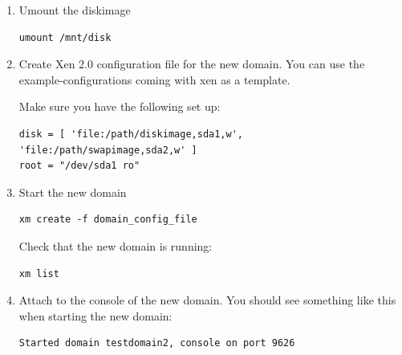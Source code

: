 \documentclass[11pt,twoside,final,openright]{xenstyle}
\begin{document}
{\begin{enumerate}
Edit the following files using vi or nano and make needed changes:
\begin{verbatim}
/etc/hostname
/etc/hosts
/etc/resolv.conf
/etc/network/interfaces
/etc/networks
\end{verbatim}

Set up access to the services, edit:
\begin{verbatim}
/etc/hosts.deny
/etc/hosts.allow
/etc/inetd.conf
\end{verbatim}

Add Debian mirror to:   
\begin{verbatim}
/etc/apt/sources.list
\end{verbatim}

Create fstab like this:
\begin{verbatim}
/dev/sda1       /       ext3    errors=remount-ro       0       1
/dev/sda2       none    swap    sw                      0       0
proc            /proc   proc    defaults                0       0
\end{verbatim}

Logout

\item      Umount the diskimage
\begin{verbatim}
umount /mnt/disk
\end{verbatim}

\item Create Xen 2.0 configuration file for the new domain. You can
        use the example-configurations coming with xen as a template.

        Make sure you have the following set up:
\begin{verbatim}
disk = [ 'file:/path/diskimage,sda1,w', 'file:/path/swapimage,sda2,w' ]
root = "/dev/sda1 ro"
\end{verbatim}

\item Start the new domain
\begin{verbatim}
xm create -f domain_config_file
\end{verbatim}

Check that the new domain is running:
\begin{verbatim}
xm list
\end{verbatim}

\item   Attach to the console of the new domain.
        You should see something like this when starting the new domain:

\begin{verbatim}
Started domain testdomain2, console on port 9626
\end{verbatim}
        

\end{enumerate}}
\end{document}
